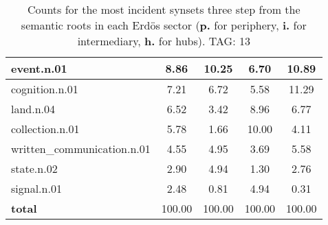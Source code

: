 \begin{table}[h!]
\begin{center}
\begin{tabular}{| l || c | c | c | c |}
event.n.01 & 8.86  & 10.25  & 6.70  & 10.89 \\\hline
cognition.n.01 & 7.21  & 6.72  & 5.58  & 11.29 \\\hline
land.n.04 & 6.52  & 3.42  & 8.96  & 6.77 \\\hline
collection.n.01 & 5.78  & 1.66  & 10.00  & 4.11 \\\hline
written\_communication.n.01 & 4.55  & 4.95  & 3.69  & 5.58 \\\hline
state.n.02 & 2.90  & 4.94  & 1.30  & 2.76 \\\hline
signal.n.01 & 2.48  & 0.81  & 4.94  & 0.31 \\\hline\hline
{{\bf total}} & 100.00  & 100.00  & 100.00  & 100.00 \\\hline
\end{tabular}
\caption{Counts for the most incident synsets three step from the semantic roots in each Erd\"os sector ({\bf p.} for periphery, {\bf i.} for intermediary, {\bf h.} for hubs). TAG: 13}
\end{center}
\end{table}